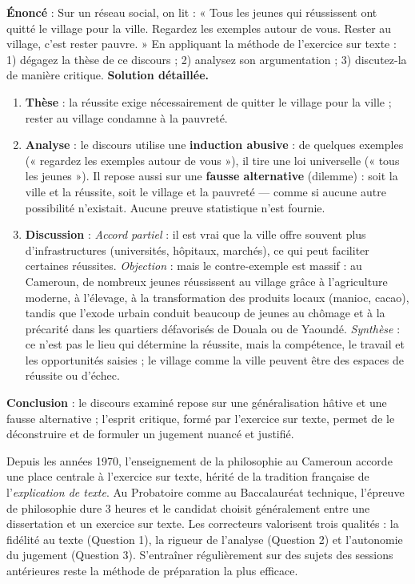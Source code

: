 \documentclass[11pt]{article}
\begin{document}
\begin{exoresolu}
\textbf{Énoncé} : Sur un réseau social, on lit : « Tous les jeunes qui réussissent ont quitté le village pour la ville. Regardez les exemples autour de vous. Rester au village, c'est rester pauvre. » En appliquant la méthode de l'exercice sur texte : 1) dégagez la thèse de ce discours ; 2) analysez son argumentation ; 3) discutez-la de manière critique.
\tcblower
\textbf{Solution détaillée.}
\begin{enumerate}
\item \textbf{Thèse} : la réussite exige nécessairement de quitter le village pour la ville ; rester au village condamne à la pauvreté.
\item \textbf{Analyse} : le discours utilise une \textbf{induction abusive} : de quelques exemples (« regardez les exemples autour de vous »), il tire une loi universelle (« tous les jeunes »). Il repose aussi sur une \textbf{fausse alternative} (dilemme) : soit la ville et la réussite, soit le village et la pauvreté — comme si aucune autre possibilité n'existait. Aucune preuve statistique n'est fournie.
\item \textbf{Discussion} : \emph{Accord partiel} : il est vrai que la ville offre souvent plus d'infrastructures (universités, hôpitaux, marchés), ce qui peut faciliter certaines réussites. \emph{Objection} : mais le contre-exemple est massif : au Cameroun, de nombreux jeunes réussissent au village grâce à l'agriculture moderne, à l'élevage, à la transformation des produits locaux (manioc, cacao), tandis que l'exode urbain conduit beaucoup de jeunes au chômage et à la précarité dans les quartiers défavorisés de Douala ou de Yaoundé. \emph{Synthèse} : ce n'est pas le lieu qui détermine la réussite, mais la compétence, le travail et les opportunités saisies ; le village comme la ville peuvent être des espaces de réussite ou d'échec.
\end{enumerate}
\textbf{Conclusion} : le discours examiné repose sur une généralisation hâtive et une fausse alternative ; l'esprit critique, formé par l'exercice sur texte, permet de le déconstruire et de formuler un jugement nuancé et justifié.
\end{exoresolu}

\begin{savaistu}
Depuis les années 1970, l'enseignement de la philosophie au Cameroun accorde une place centrale à l'exercice sur texte, hérité de la tradition française de l'\emph{explication de texte}. Au Probatoire comme au Baccalauréat technique, l'épreuve de philosophie dure 3 heures et le candidat choisit généralement entre une dissertation et un exercice sur texte. Les correcteurs valorisent trois qualités : la fidélité au texte (Question 1), la rigueur de l'analyse (Question 2) et l'autonomie du jugement (Question 3). S'entraîner régulièrement sur des sujets des sessions antérieures reste la méthode de préparation la plus efficace.
\end{savaistu}
\end{document}
